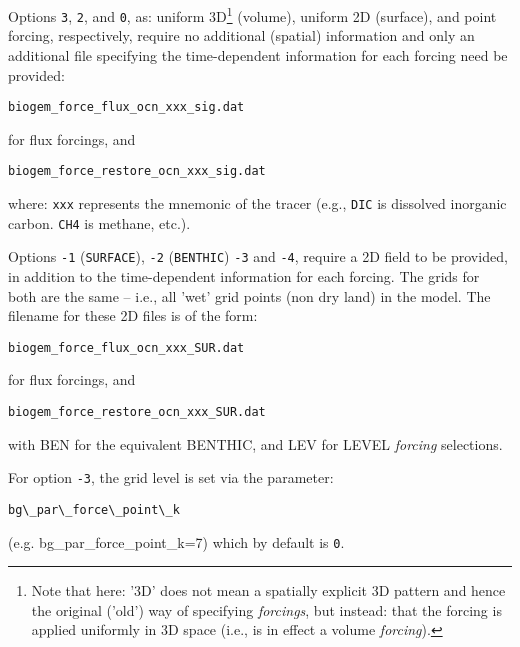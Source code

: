 \documentclass[11pt,fleqn]{book} %
\begin{document}
Options \texttt{3}, \texttt{2}, and \texttt{0}, as: uniform 3D\footnote{Note that here: '3D' does not mean a spatially explicit 3D pattern and hence the original ('old') way of specifying \textit{forcings}, but instead: that the forcing is applied uniformly in 3D space (i.e., is in effect a volume \textit{forcing}).} (volume), uniform 2D (surface), and point forcing, respectively, require no additional (spatial) information and only an additional file specifying the time-dependent information for each forcing need be provided:
\vspace{-2pt}\small\begin{verbatim}
biogem_force_flux_ocn_xxx_sig.dat
\end{verbatim}\normalsize\vspace{-2pt}
for flux forcings, and 
\vspace{-2pt}\small\begin{verbatim}
biogem_force_restore_ocn_xxx_sig.dat
\end{verbatim}\normalsize\vspace{-2pt}
where: \texttt{xxx} represents the mnemonic of the tracer (e.g., \texttt{DIC} is dissolved inorganic carbon. \texttt{CH4} is methane, etc.).

Options \texttt{-1} (\texttt{SURFACE}), \texttt{-2} (\texttt{BENTHIC}) \texttt{-3} and  \texttt{-4}, require a 2D field to be provided, in addition to the time-dependent information for each forcing. The grids for both are the same -- i.e., all 'wet' grid points (non dry land) in the model. The filename for these 2D files is of the form:
\vspace{-2pt}\small\begin{verbatim}
biogem_force_flux_ocn_xxx_SUR.dat
\end{verbatim}\normalsize\vspace{-2pt}
for flux forcings, and 
\vspace{-2pt}\small\begin{verbatim}
biogem_force_restore_ocn_xxx_SUR.dat
\end{verbatim}\normalsize\vspace{-2pt}
with \textsf{\footnotesize BEN} for the equivalent BENTHIC, and \textsf{\footnotesize LEV} for LEVEL \textit{forcing} selections.

For option \texttt{-3}, the grid level is set via the parameter:
\vspace{-2pt}\small\begin{verbatim}
bg\_par\_force\_point\_k
\end{verbatim}\normalsize\vspace{-2pt}
(e.g. bg\_par\_force\_point\_k=7) which by default is \texttt{0}.
 
\end{document}
